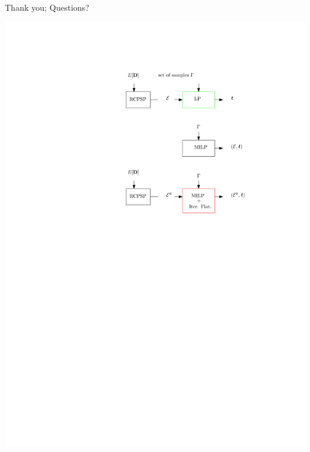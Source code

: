 \begin{frame}{Thank you; Questions?}

\begin{center}
\includegraphics[height=0.8\textheight]{methods3}
\end{center}

\end{frame}

   